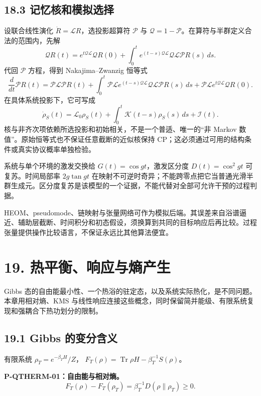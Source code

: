 \documentclass[
  11pt,
  oneside]{book}
\begin{document}
\section{18.3 记忆核和模拟选择}

设联合线性演化 \(\dot R=\mathcal LR\)，选投影超算符 \(\mathcal P\) 与
\(\mathcal Q=1-\mathcal P\)。在算符与半群定义合法的范围内，先解 \[
\mathcal QR(t)=e^{t\mathcal Q\mathcal L}\mathcal QR(0)
+\int_0^t e^{(t-s)\mathcal Q\mathcal L}
\mathcal Q\mathcal L\mathcal PR(s)\,ds.
\] 代回 \(\mathcal P\) 方程，得到 Nakajima--Zwanzig 恒等式 \[
\frac d{dt}\mathcal PR(t)=\mathcal P\mathcal L\mathcal PR(t)
+\int_0^t\mathcal P\mathcal L e^{(t-s)\mathcal Q\mathcal L}
\mathcal Q\mathcal L\mathcal PR(s)\,ds
+\mathcal P\mathcal L e^{t\mathcal Q\mathcal L}\mathcal QR(0).
\] 在具体系统投影下，它可写成 \[
\dot\rho_S(t)=\mathcal L_0\rho_S(t)
+\int_0^t\mathcal K(t-s)\rho_S(s)\,ds+\mathcal I(t).
\] 核与非齐次项依赖所选投影和初始相关，不是一个普适、唯一的``非 Markov
数值''。原始恒等式也不保证任意截断的近似核保持
CP；这必须通过可用的结构条件或真实协议概率单独检验。

系统与单个环境的激发交换给 \(G(t)=\cos gt\)，激发区分度
\(D(t)=\cos^2gt\) 可复苏。时间局部率 \(2g\tan gt\)
在映射不可逆时奇异；不能跨零点把它当普通光滑半群生成元。区分度复苏是该模型的一个证据，不能代替对全部可允许干预的过程判据。

HEOM、pseudomode、链映射与张量网络可作为模拟后端。其误差来自浴谱逼近、辅助层截断、时间积分和初态假设，须换算到共同的目标响应后再比较。过程张量提供操作比较语言，不保证永远比其他算法便宜。

\chapter{19. 热平衡、响应与熵产生}\label{ch-19}\hypertarget{ch-19}{}

Gibbs
态的自由能最小性、一个热浴的驻定态，以及系统实际热化，是不同问题。本章用相对熵、KMS
与线性响应连接这些概念，同时保留简并能级、有限系统复现和强耦合下热功划分的限制。

\section{19.1 Gibbs 的变分含义}

有限系统 \(\rho_T=e^{-\beta_TH}/Z\)，
\(F_T(\rho)=\operatorname{Tr}\rho H-\beta_T^{-1}S(\rho)\)。

\protect\hypertarget{p-qtherm-01}{}{}

\textbf{P-QTHERM-01：自由能与相对熵。} \[
F_T(\rho)-F_T(\rho_T)
=\beta_T^{-1}D(\rho\|\rho_T)\ge0.
\]
\end{document}

